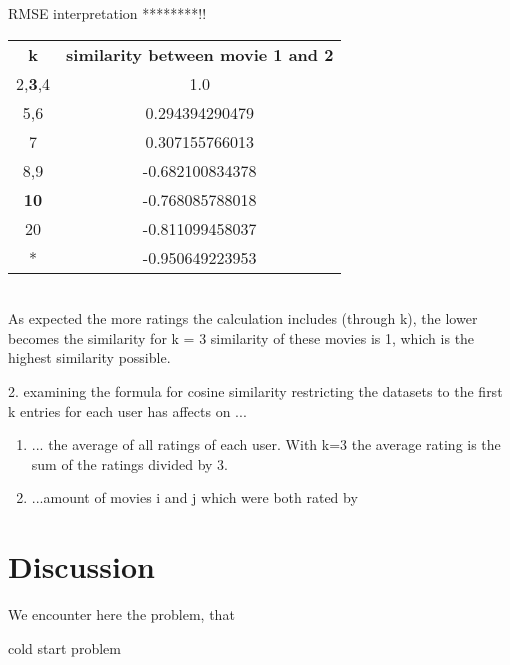 \documentclass[a4paper,12pt,twoside]{article}
\begin{document}
RMSE interpretation ********!!
\\

\begin{tabular}{cc}
	\textbf{k} & \textbf{similarity between movie 1 and 2} \\
	2,\textbf{3},4 & 1.0 \\
	5,6 & 0.294394290479\\
	7& 0.307155766013\\
	8,9 & -0.682100834378\\
	\textbf{10} & -0.768085788018\\
	20 & -0.811099458037\\
	* & -0.950649223953\\
\end{tabular} \\
As expected the more ratings the calculation includes (through k), the lower becomes the similarity
for k = 3 similarity of these movies is 1, which is the highest similarity possible.

2. examining the formula for cosine similarity
restricting the datasets to the first k entries for each user has affects on ...

\begin{enumerate}
	\item ... the average of all ratings of each user. With k=3 the average rating is the sum of the ratings divided by 3.
	\item ...amount of movies i and j which were both rated by 
\end{enumerate}



\section{Discussion}
We encounter here the problem, that

cold start problem
\end{document}
